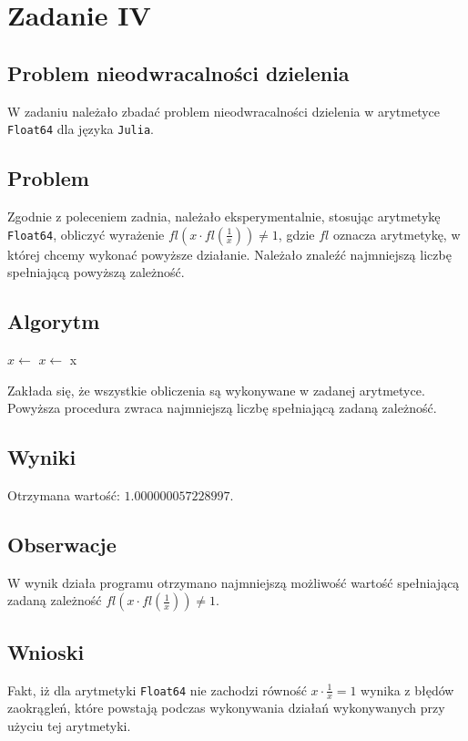 \documentclass{article}
\begin{document}
\section{Zadanie IV}
\subsection{Problem nieodwracalności dzielenia}
W zadaniu należało zbadać problem nieodwracalności dzielenia w arytmetyce \texttt{Float64} dla języka \texttt{Julia}.

\subsection{Problem}
Zgodnie z poleceniem zadnia, należało eksperymentalnie, stosując arytmetykę \texttt{Float64}, obliczyć wyrażenie $fl(x \cdot fl(\frac{1}{x})) \neq 1$, gdzie $fl$ oznacza arytmetykę, w której chcemy wykonać powyższe działanie. Należało znaleźć najmniejszą liczbę spełniającą powyższą zależność.

\subsection{Algorytm}
\begin{algorithm}
    \begin{algorithmic}[1]
            \State $x \gets$ 
                \State $x \gets$ 
            \EndWhile
            \State \Return x
        \EndFunction
    \end{algorithmic}
\end{algorithm}
Zakłada się, że wszystkie obliczenia są wykonywane w zadanej arytmetyce. Powyższa procedura zwraca najmniejszą liczbę spełniającą zadaną zależność.

\subsection{Wyniki}
Otrzymana wartość: $1.000000057228997$.

\subsection{Obserwacje}
W wynik działa programu otrzymano najmniejszą możliwość wartość spełniającą zadaną zależność $fl(x \cdot fl(\frac{1}{x})) \neq 1$.

\subsection{Wnioski}
Fakt, iż dla arytmetyki \texttt{Float64} nie zachodzi równość $x \cdot \frac{1}{x} = 1$ wynika z błędów zaokrągleń, które powstają podczas wykonywania działań wykonywanych przy użyciu tej arytmetyki.
\end{document}

